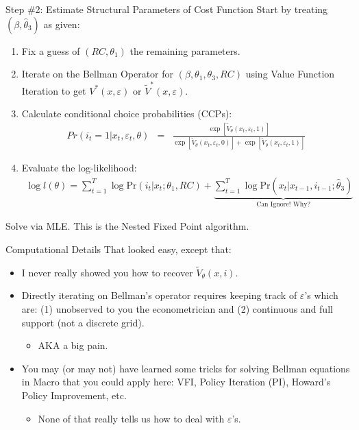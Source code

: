 \documentclass[xcolor=pdftex,dvipsnames,table,mathserif,aspectratio=169]{beamer}
\begin{document}
\begin{frame}{Step \#2: Estimate Structural Parameters of Cost Function}
Start by treating $(\beta, \hat \theta_3)$ as given:
\begin{enumerate}
\item Fix a guess of $(RC,\theta_1)$ the remaining parameters. 
\item Iterate on the Bellman Operator for $(\beta,\theta_1,\theta_3,RC)$ using \alert{Value Function Iteration} to get $V^*(x,\varepsilon)$ or $\tilde V^*(x,\varepsilon)$.
\item Calculate \alert{conditional choice probabilities} (CCPs):
\begin{eqnarray*}
Pr(i_t=1 | x_t,\varepsilon_t,\theta) &=&  \frac {\exp[ \tilde V_{\theta} (x_t, \varepsilon_t, 1)]  }{\exp[\tilde  V_{\theta} (x_t, \varepsilon_t, 0)] + \exp[ \tilde  V_{\theta} (x_t, \varepsilon_t, 1)]} 
\end{eqnarray*} 
\item Evaluate the log-likelihood:
\begin{eqnarray*}
\log l(\theta) = \sum^T_{t=1} \log \text{Pr} (i_t | x_t ; \theta_1,RC) + \underbrace{\sum^T_{t=1} \log \text{Pr} (x_t | x_{t-1}, i_{t-1}; \hat{\theta}_3)}_{\text{Can Ignore! Why?}}
\end{eqnarray*}
\end{enumerate}
Solve via MLE. This is the \alert{Nested Fixed Point} algorithm.
\end{frame}

\begin{frame}{Computational Details}
That looked easy, except that:
\begin{itemize}
\item I never really showed you how to recover $\tilde{V}_{\theta}(x,i)$.
\item Directly iterating on Bellman's operator requires keeping track of $\varepsilon$'s which are: (1) unobserved to you the econometrician and (2) continuous and full support (not a discrete grid).
\begin{itemize}
\item AKA a big pain.
\end{itemize}
\item You may (or may not) have learned some tricks for solving Bellman equations in Macro that you could apply here: VFI, Policy Iteration (PI), Howard's Policy Improvement, etc.
\begin{itemize}
\item None of that really tells us how to deal with $\varepsilon$'s.
\end{itemize}
\end{itemize}
\end{frame}
\end{document}
